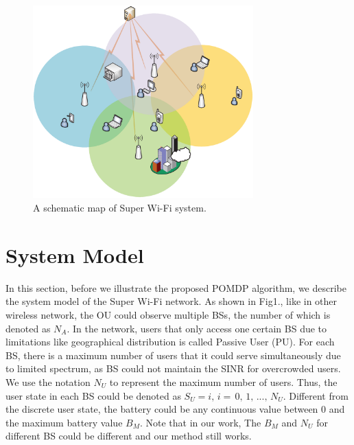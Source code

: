 \documentclass[conference]{IEEEtran}
\begin{document}
\begin{figure}
\centering
\includegraphics[width=8.5cm]{Fig1.eps}
\caption{A schematic map of Super Wi-Fi system.}
\end{figure}
\section{System Model}
In this section, before we illustrate the proposed POMDP algorithm,
we describe the system model of the Super Wi-Fi network.
As shown in Fig1., like in other wireless network,
the OU could observe multiple BSs, the number of which is denoted as \(N_A\).
In the network, users that only access one certain BS due to limitations like geographical distribution is called Passive User (PU).
For each BS, there is a maximum number of users that it could serve simultaneously due to limited spectrum,
as BS could not maintain the SINR for overcrowded users.
We use the notation \(N_U\) to represent the maximum number of users.
Thus, the user state in each BS could be denoted as \(S_U = i,\, i = \,0,\,1,\,...,\,N_U\).
Different from the discrete user state, the battery could be any continuous value between \(0\)
and the maximum battery value \(B_M\).
Note that in our work, The \(B_M\) and \(N_U\) for different BS could be different and our method still works.\\
\end{document}
